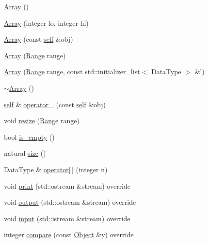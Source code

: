 \begin{DoxyCompactItemize}
\item 
\hyperlink{classez_1_1objects_1_1Array_a88ec7bab9f66c8fe7d97b4782a39ee84}{Array} ()
\item 
\hyperlink{classez_1_1objects_1_1Array_ab389febcc8d618c3b660fac1236898cb}{Array} (integer lo, integer hi)
\item 
\hyperlink{classez_1_1objects_1_1Array_a9ece37ee368a988a62351e8df1cdf220}{Array} (const \hyperlink{classez_1_1objects_1_1Array}{self} \&obj)
\item 
\hyperlink{classez_1_1objects_1_1Array_acc9a9ce3babaa4f1aa6d744304e2ccd0}{Array} (\hyperlink{classez_1_1essential_1_1Range}{Range} range)
\item 
\hyperlink{classez_1_1objects_1_1Array_a599e786f9331bd12c7eeef4a6e1ad043}{Array} (\hyperlink{classez_1_1essential_1_1Range}{Range} range, const std\+::initializer\+\_\+list$<$ Data\+Type $>$ \&l)
\item 
\hyperlink{classez_1_1objects_1_1Array_aa7998741d7bd1d2f92248846b39f5b2a}{$\sim$\+Array} ()
\item 
\hyperlink{classez_1_1objects_1_1Array}{self} \& \hyperlink{classez_1_1objects_1_1Array_a243625ca16cb6b1f7a7f68dc7a1922cf}{operator=} (const \hyperlink{classez_1_1objects_1_1Array}{self} \&obj)
\item 
void \hyperlink{classez_1_1objects_1_1Array_acdd164cad40bed068075550d943d19c2}{resize} (\hyperlink{classez_1_1essential_1_1Range}{Range} range)
\item 
bool \hyperlink{classez_1_1objects_1_1Array_a281b310f3f9f4140520b84c2315b1352}{is\+\_\+empty} ()
\item 
natural \hyperlink{classez_1_1objects_1_1Array_af3ac644ccc4058fb2e13797af274a3de}{size} ()
\item 
Data\+Type \& \hyperlink{classez_1_1objects_1_1Array_add86e335b90914397700e6f2cad45077}{operator\mbox{[}$\,$\mbox{]}} (integer n)
\item 
void \hyperlink{classez_1_1objects_1_1Array_a7f0707629712319837dc0cda091456b7}{print} (std\+::ostream \&stream) override
\item 
void \hyperlink{classez_1_1objects_1_1Array_a7f8b26dd8b96708d0a300a1f406ce336}{output} (std\+::ostream \&stream) override
\item 
void \hyperlink{classez_1_1objects_1_1Array_a438c2c6187dd5cce0dae9f303b34609c}{input} (std\+::istream \&stream) override
\item 
integer \hyperlink{classez_1_1objects_1_1Array_ac0d97a024e177f655b2f58981a68fcf8}{compare} (const \hyperlink{classez_1_1objects_1_1Object}{Object} \&y) override

\end{DoxyCompactItemize}
